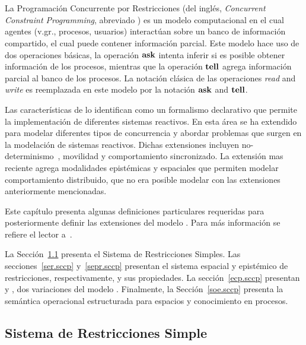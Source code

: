 
\chapter{\SCCP}
\label{chapter.sccp}      

La Programaci\'on Concurrente por Restricciones (del ingl\'es, \textit{Concurrent Constraint Programming}, abreviado \textbf{\CCP}) es un modelo computacional en el cual agentes (v.gr., procesos, usuarios) interact\'uan sobre un banco de informaci\'on compartido, el cual puede contener informaci\'on parcial. Este modelo hace uso de dos operaciones b\'asicas, la operaci\'on ${\bf ask}$ intenta inferir si es posible obtener informaci\'on de los procesos, mientras que la operaci\'on ${\bf tell}$ agrega informaci\'on parcial al banco de los procesos. La notaci\'on cl\'asica de las operaciones \textit{read} and \textit{write} es reemplazada en este modelo por la notaci\'on ${\bf ask}$ and ${\bf tell}$. 

Las caracter\'isticas de \textbf{\CCP} lo identifican como un formalismo declarativo que permite la implementaci\'on de diferentes sistemas reactivos. En esta \'area \textbf{\CCP} se ha extendido para modelar diferentes tipos de concurrencia y abordar problemas que surgen en la modelaci\'on de sistemas reactivos. Dichas extensiones incluyen no-determinismo~\cite{Nielsen:2002:TCC:643009.643014}, movilidad y comportamiento sincronizado. La extensi\'on mas reciente agrega modalidades epist\'emicas y espaciales que permiten modelar comportamiento distribuido, que no era posible modelar con las extensiones anteriormente mencionadas.

Este cap\'itulo presenta algunas definiciones particulares requeridas para posteriormente definir las extensiones del modelo \textbf{\CCP}. Para m\'as informaci\'on se refiere el lector a~\cite{knight:hal-00761116}.

La Secci\'on~\ref{srs.sccp} presenta el Sistema de Restricciones Simples. Las secciones~\ref{ser.sccp} y~\ref{sepr.sccp} presentan el sistema espacial y epist\'emico de restricciones, respectivamente, y sus propiedades. La secci\'on~\ref{ecp.sccp} presentan \SCCP y \ECCP, dos variaciones del modelo \CCP. Finalmente, la Secci\'on~\ref{soe.sccp} presenta la sem\'antica operacional estructurada para espacios y conocimiento en procesos.

\section{Sistema de Restricciones Simple}
\label{srs.sccp}

